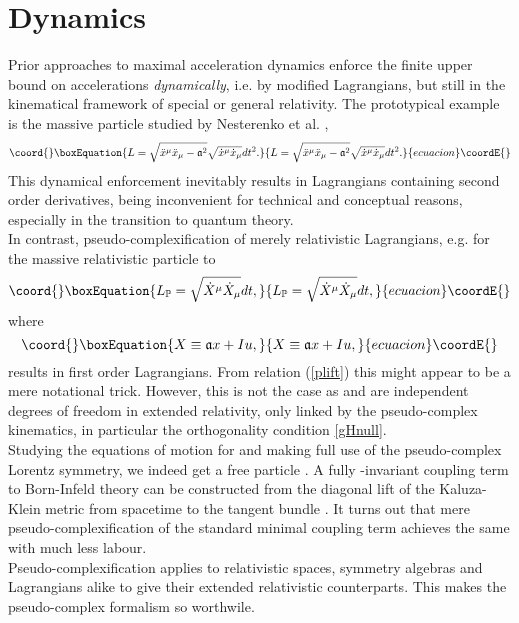 \documentclass[11pt,a4paper,twoside]{article}
\providecommand{\pc}{\mathbb{P}}
\begin{document}
\section{Dynamics}
Prior approaches \cite{Nestsecond} to maximal acceleration dynamics enforce
the finite upper bound on accelerations \textsl{dynamically}, i.e. by
modified Lagrangians, but still in the kinematical framework of special
or general relativity. The prototypical example is the massive
particle studied by Nesterenko et al. \cite{Nestaction},
\begin{equation}\coord{}\boxEquation{
  L = \sqrt{\ddot x^\mu \ddot x_\mu - \mathfrak{a}^2} \sqrt{\dot x^\mu
  \dot x_\mu} dt^2.
}{
  L = \sqrt{\ddot x^\mu \ddot x_\mu - \mathfrak{a}^2} \sqrt{\dot x^\mu
  \dot x_\mu} dt^2.
}{ecuacion}\coordE{}\end{equation}
This dynamical enforcement inevitably results in Lagrangians containing second order
derivatives, being inconvenient for technical and conceptual reasons,
especially in the transition to quantum theory.\\
In contrast, pseudo-complexification of merely relativistic
Lagrangians, e.g. for the massive relativistic particle to
\begin{equation}\coord{}\boxEquation{
 L_\pc = \sqrt{\dot X^\mu \dot X_\mu} dt,
}{
 L_\pc = \sqrt{\dot X^\mu \dot X_\mu} dt,
}{ecuacion}\coordE{}\end{equation}
where
\begin{equation}\coord{}\boxEquation{\label{plift}
  X \equiv \mathfrak{a} x + I u,
}{X \equiv \mathfrak{a} x + I u,
}{ecuacion}\coordE{}\end{equation}
results in first order Lagrangians. From relation (\ref{plift}) this
might appear to be a mere notational trick. However, this is not the
case as \coordHE{} and \coordHE{} are independent degrees of freedom in extended
relativity, only linked by the pseudo-complex kinematics, in
particular the orthogonality condition \ref{gHnull}.\\
Studying the equations of motion for \myHighlight{$L_\pc$}\coordHE{}  and making full use of
the pseudo-complex Lorentz symmetry, we indeed get a free particle
\cite{bik_paper}. A fully
\myHighlight{$SO_\pc(1,3)$}\coordHE{}-invariant coupling term to Born-Infeld theory can be
constructed from the diagonal lift of the Kaluza-Klein metric from
spacetime to the tangent bundle \cite{bik_paper}. It turns out that
mere
pseudo-complexification of the standard minimal coupling term achieves
the same with much less labour.\\
Pseudo-complexification applies to relativistic spaces, symmetry algebras and
Lagrangians alike to give their extended relativistic
counterparts. This makes the pseudo-complex formalism so worthwile.
\end{document}
